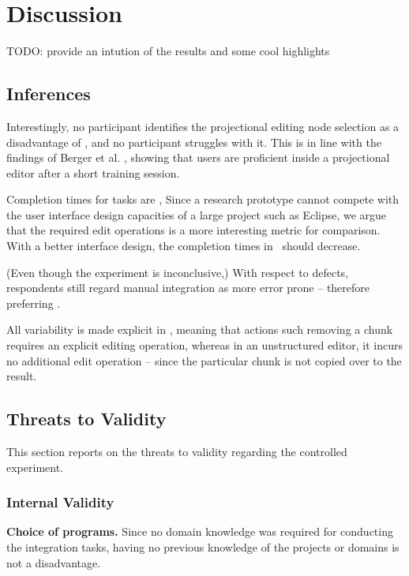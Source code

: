 \chapter{Discussion}
TODO: provide an intution of the results and some cool highlights

\section{Inferences}
Interestingly, no participant identifies the projectional editing node selection as a disadvantage of \tooln, and no participant struggles with it. This is in line with the findings of Berger et al. \cite{berger2016mps}, showing that users are proficient inside a projectional editor after a short training session.

Completion times for tasks are , Since a research prototype cannot compete with the user interface design capacities of a large project such as Eclipse, we argue that the required edit operations is a more interesting metric for comparison. With a better interface design, the completion times in \tooln~should decrease. 

(Even though the experiment is inconclusive,)
With respect to defects, respondents still regard manual integration as more error prone -- therefore preferring \tooln.

All variability is made explicit in \tooln, meaning that actions such removing a chunk requires an explicit editing operation, whereas in an unstructured editor, it incurs no additional edit operation -- since the particular chunk is not copied over to the result.


\section{Threats to Validity}
This section reports on the threats to validity regarding the controlled experiment.

\subsection{Internal Validity}
\textbf{Choice of programs.} 
Since no domain knowledge was required for conducting the integration tasks, having no previous knowledge of the projects or domains is not a disadvantage.

